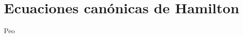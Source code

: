 \documentclass[../main.tex]{subfiles}
\begin{document}
\section{Ecuaciones canónicas de Hamilton}
Peo
\end{document}

